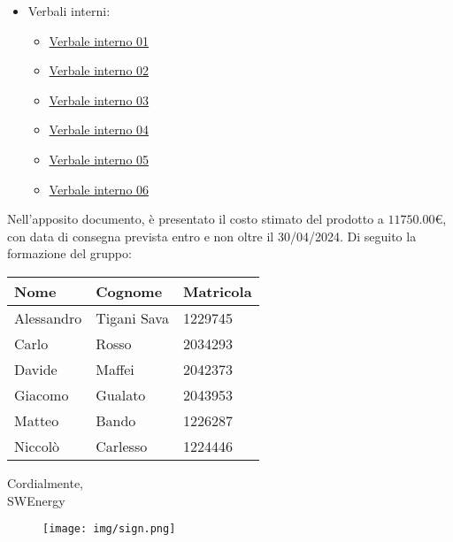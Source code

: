 \begin{itemize}
	\item Verbali interni:
		\begin{itemize}
			\item
				\href{https://github.com/Project-SWEnergy/documentazione/blob/main/Candidatura/Verbali/Interni/Verbale%20interno%20-%2001.pdf}{Verbale interno 01}
			\item
				\href{https://github.com/Project-SWEnergy/documentazione/blob/main/Candidatura/Verbali/Interni/Verbale%20interno%20-%2002.pdf}{Verbale interno 02}
			\item
				\href{https://github.com/Project-SWEnergy/documentazione/blob/main/Candidatura/Verbali/Interni/Verbale%20interno%20-%2003.pdf}{Verbale interno 03}
			\item
				\href{https://github.com/Project-SWEnergy/documentazione/blob/main/Candidatura/Verbali/Interni/Verbale%20interno%20-%2004.pdf}{Verbale interno 04}
			\item
				\href{https://github.com/Project-SWEnergy/documentazione/blob/main/Candidatura/Verbali/Interni/Verbale%20interno%20-%2005.pdf}{Verbale interno 05}
            \item
				\href{https://github.com/Project-SWEnergy/documentazione/blob/main/Candidatura/Verbali/Interni/Verbale%20interno%20-%2006.pdf}{Verbale interno 06}
		\end{itemize}
\end{itemize}


\noindent
Nell'apposito documento, è presentato il costo stimato del prodotto a 
$11750.00$\euro, 
con data di consegna prevista entro e non oltre il 30/04/2024. Di seguito la
formazione del gruppo:
\begin{center}
{
\renewcommand{\arraystretch}{1.5}
\begin{tabular}{lll}
	\textbf{Nome} & \textbf{Cognome}	& \textbf{Matricola}		\\
	\hline
	Alessandro	&	Tigani Sava		 	&	1229745					\\
	Carlo		&	Rosso			 	&	2034293					\\
	Davide		&	Maffei			 	& 	2042373					\\
	Giacomo 	&	Gualato			 	& 	2043953					\\
	Matteo		&	Bando				&	1226287					\\
	Niccolò 	&	Carlesso		 	& 	1224446					\\
	\hline
\end{tabular}
}
\end{center}

\vspace{1cm}

\noindent
Cordialmente, \\
SWEnergy

\begin{figure}[H]
	\texttt{[image: img/sign.png]}
\end{figure}
